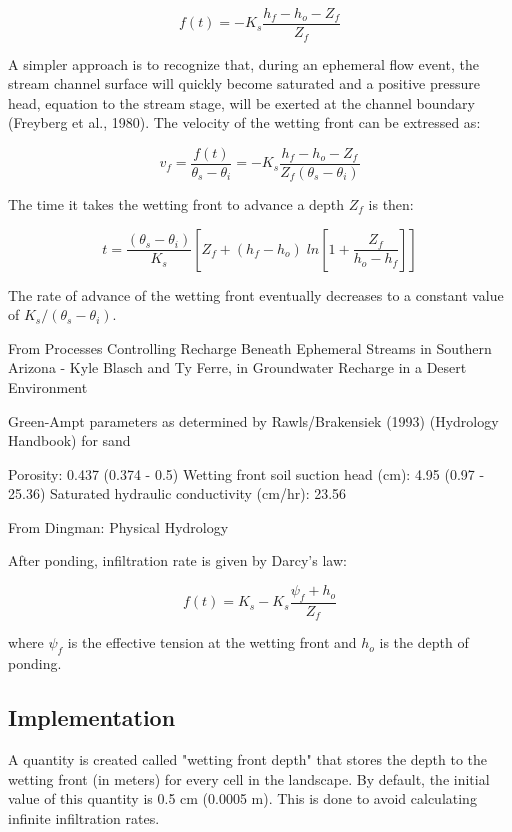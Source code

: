 \documentclass[11pt]{article}
\begin{document}
\begin{equation}
f(t) = - K_s \frac{h_f - h_o - Z_f}{Z_f}
\end{equation}

A simpler approach is to recognize that, during an ephemeral flow event, the stream channel surface will quickly become saturated and a positive pressure head, equation to the stream stage, will be exerted at the channel boundary (Freyberg et al., 1980). The velocity of the wetting front can be extressed as:

\begin{equation}
v_f = \frac{f(t)}{\theta_s - \theta_i} = -K_s \frac{h_f - h_o - Z_f}{Z_f (\theta_s - \theta_i)}
\end{equation}

The time it takes the wetting front to advance a depth $Z_f$ is then:

\begin{equation}
t = \frac{(\theta_s - \theta_i)}{K_s} \left[ Z_f + (h_f - h_o) \; ln \left[1 + \frac{Z_f}{h_o - h_f}\right]\right]
\end{equation}

The rate of advance of the wetting front eventually decreases to a constant value of $K_s / (\theta_s - \theta_i)$.

From Processes Controlling Recharge Beneath Ephemeral Streams in Southern Arizona - Kyle Blasch and Ty Ferre, in Groundwater Recharge in a Desert Environment


Green-Ampt parameters as determined by Rawls/Brakensiek (1993) (Hydrology Handbook) for sand

Porosity: 0.437 (0.374 - 0.5)
Wetting front soil suction head (cm): 4.95 (0.97 - 25.36)
Saturated hydraulic conductivity (cm/hr): 23.56

From Dingman: Physical Hydrology

After ponding, infiltration rate is given by Darcy's law:

\begin{equation}
f(t) = K_s - K_s \frac{\psi_f + h_o}{Z_f}
\end{equation}

\noindent where $\psi_f$ is the effective tension at the wetting front and $h_o$ is the depth of ponding.

\subsection{Implementation}

A quantity is created called "wetting front depth" that stores the depth to the wetting front (in meters) for every cell in the landscape. By default, the initial value of this quantity is 0.5 cm (0.0005 m). This is done to avoid calculating infinite infiltration rates.
\end{document}
